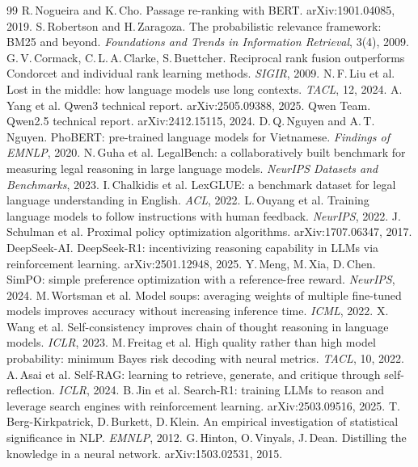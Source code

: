 \documentclass[11pt,a4paper]{article}
\begin{document}
\begin{thebibliography}{99}
 R.\,Nogueira and K.\,Cho. Passage re-ranking with BERT. arXiv:1901.04085, 2019.
 S.\,Robertson and H.\,Zaragoza. The probabilistic relevance framework: BM25 and beyond. \textit{Foundations and Trends in Information Retrieval}, 3(4), 2009.
 G.\,V.\,Cormack, C.\,L.\,A.\,Clarke, S.\,Buettcher. Reciprocal rank fusion outperforms Condorcet and individual rank learning methods. \textit{SIGIR}, 2009.
 N.\,F.\,Liu et al. Lost in the middle: how language models use long contexts. \textit{TACL}, 12, 2024.
 A.\,Yang et al. Qwen3 technical report. arXiv:2505.09388, 2025.
 Qwen Team. Qwen2.5 technical report. arXiv:2412.15115, 2024.
 D.\,Q.\,Nguyen and A.\,T.\,Nguyen. PhoBERT: pre-trained language models for Vietnamese. \textit{Findings of EMNLP}, 2020.
 N.\,Guha et al. LegalBench: a collaboratively built benchmark for measuring legal reasoning in large language models. \textit{NeurIPS Datasets and Benchmarks}, 2023.
 I.\,Chalkidis et al. LexGLUE: a benchmark dataset for legal language understanding in English. \textit{ACL}, 2022.
 L.\,Ouyang et al. Training language models to follow instructions with human feedback. \textit{NeurIPS}, 2022.
 J.\,Schulman et al. Proximal policy optimization algorithms. arXiv:1707.06347, 2017.
 DeepSeek-AI. DeepSeek-R1: incentivizing reasoning capability in LLMs via reinforcement learning. arXiv:2501.12948, 2025.
 Y.\,Meng, M.\,Xia, D.\,Chen. SimPO: simple preference optimization with a reference-free reward. \textit{NeurIPS}, 2024.
 M.\,Wortsman et al. Model soups: averaging weights of multiple fine-tuned models improves accuracy without increasing inference time. \textit{ICML}, 2022.
 X.\,Wang et al. Self-consistency improves chain of thought reasoning in language models. \textit{ICLR}, 2023.
 M.\,Freitag et al. High quality rather than high model probability: minimum Bayes risk decoding with neural metrics. \textit{TACL}, 10, 2022.
 A.\,Asai et al. Self-RAG: learning to retrieve, generate, and critique through self-reflection. \textit{ICLR}, 2024.
 B.\,Jin et al. Search-R1: training LLMs to reason and leverage search engines with reinforcement learning. arXiv:2503.09516, 2025.
 T.\,Berg-Kirkpatrick, D.\,Burkett, D.\,Klein. An empirical investigation of statistical significance in NLP. \textit{EMNLP}, 2012.
 G.\,Hinton, O.\,Vinyals, J.\,Dean. Distilling the knowledge in a neural network. arXiv:1503.02531, 2015.

\end{thebibliography}
\end{document}
